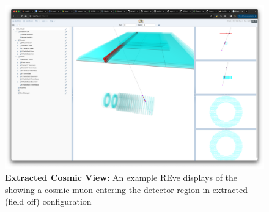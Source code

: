 \begin{figure}[htb]
\begin{center}
\includegraphics[width=0.9\linewidth]{figures/extracted.png}
\caption{\textbf{Extracted Cosmic View:} An example REve displays of the showing a cosmic muon entering the detector region in extracted (field off) configuration}
\label{fig:teve_3D_extracted}
\end{center}
\end{figure}

















